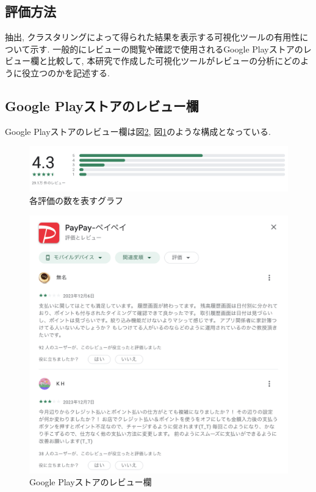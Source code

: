 \subsection{評価方法}
抽出, クラスタリングによって得られた結果を表示する可視化ツールの有用性について示す. 一般的にレビューの閲覧や確認で使用されるGoogle Playストアのレビュー欄と比較して, 本研究で作成した可視化ツールがレビューの分析にどのように役立つのかを記述する. 

\subsection{Google Playストアのレビュー欄}
Google Playストアのレビュー欄は図\ref{fig:google_play}, 図\ref{fig:google_play_graph}のような構成となっている. 

\begin{figure}[H]
  \centering
  \includegraphics[scale=0.4]
    {contents/images/google_play_graph.png}
  \caption{各評価の数を表すグラフ\label{fig:google_play_graph}}
\end{figure}

\begin{figure}[H]
  \centering
  \includegraphics[scale=0.4]
    {contents/images/google_play.png}
  \caption{Google Playストアのレビュー欄\label{fig:google_play}}
\end{figure}

